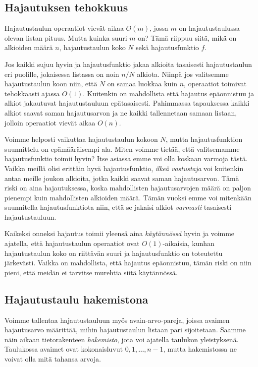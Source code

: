 \subsection{Hajautuksen tehokkuus}

Hajautustaulun operaatiot vievät aikaa $O(m)$,
jossa $m$ on hajautustaulussa olevan listan pituus.
Mutta kuinka suuri $m$ on? Tämä riippuu siitä,
mikä on alkioiden määrä $n$, hajautustaulun koko $N$
sekä hajautusfunktio $f$.

Jos kaikki sujuu hyvin ja hajautusfunktio jakaa alkioita
tasaisesti hajautustaulun eri puolille,
jokaisessa listassa on noin $n/N$ alkiota.
Niinpä jos valitsemme hajautustaulun koon niin,
että $N$ on samaa luokkaa kuin $n$,
operaatiot toimivat tehokkaasti ajassa $O(1)$.
Kuitenkin on mahdollista että hajautus epäonnistuu
ja alkiot jakautuvat hajautustauluun epätasaisesti.
Pahimmassa tapauksessa kaikki alkiot saavat saman
hajautusarvon ja ne kaikki tallennetaan samaan listaan,
jolloin operaatiot vievät aikaa $O(n)$.

Voimme helposti vaikuttaa hajautustaulun kokoon $N$,
mutta hajautusfunktion suunnittelu on epämääräisempi ala.
Miten voimme tietää, että valitsemamme hajautusfunktio
toimii hyvin?
Itse asiassa emme voi olla koskaan varmoja tästä.
Vaikka meillä olisi erittäin hyvä hajautusfunktio,
\emph{ilkeä vastustaja} voi kuitenkin antaa
meille joukon alkioita, jotka kaikki saavat saman hajautusarvon.
Tämä riski on aina hajautuksessa, koska mahdollisten
hajautusarvojen määrä on paljon pienempi kuin mahdollisten alkioiden määrä.
Tämän vuoksi emme voi mitenkään suunnitella hajautusfunktiota niin,
että se jakaisi alkiot \emph{varmasti} tasaisesti hajautustauluun.

Kaikeksi onneksi hajautus toimii yleensä aina \emph{käytännössä}
hyvin ja voimme ajatella, että hajautustaulun operaatiot ovat
$O(1)$-aikaisia, kunhan hajautustaulun koko on riittävän suuri ja
hajautusfunktio on toteutettu järke\-västi.
Vaikka on mahdollista, että hajautus epäonnistuu,
tämän riski on niin pieni, että meidän ei tarvitse murehtia
siitä käytännössä.

\subsection{Hajautustaulu hakemistona}


Voimme tallentaa hajautustauluun myös
avain-arvo-pareja, joissa avaimen hajautusarvo määrittää,
mihin hajautustaulun listaan pari sijoitetaan.
Saamme näin aikaan tietorakenteen \emph{hakemisto},
jota voi ajatella taulukon yleistyksenä.
Taulukossa avaimet ovat kokonaisluvut $0,1,\dots,n-1$,
mutta hakemistossa ne voivat olla mitä tahansa arvoja.

